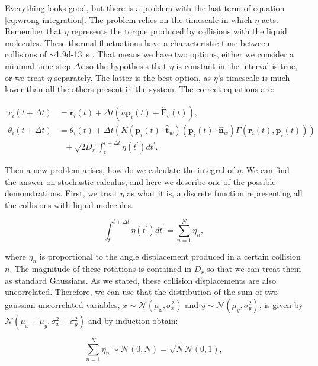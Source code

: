 Everything looks good, but there is a problem with the last term of equation \eqref{eq:wrong integration}. The problem relies on the timescale in which $\eta$ acts. Remember that $\eta$ represents the torque produced by collisions with the liquid molecules. These thermal fluctuations have a characteristic time between collisions of $\sim$\SI{1.9d-13}{\second} \cite{Soto2016KineticPhenomena}. That means we have two options, either we consider a minimal time step $\Delta t$ so the hypothesis that $\eta$ is constant in the interval is true, or we treat $\eta$ separately. The latter is the best option, as $\eta$'s timescale is much lower than all the others present in the system. The correct equations are:

\begin{align}
    \textbf{r}_i(t+\Delta t) &=  \textbf{r}_i(t) + \Delta t(u \textbf{p}_i(t) + \tilde{\textbf{F}}_c(t)), \\
    \theta_i(t+\Delta t) &=  \theta_i(t) + \Delta t(K (\textbf{p}_i(t) \cdot \hat{\textbf{t}}_w)  (\textbf{p}_i(t) \cdot \hat{\textbf{n}}_w) \Gamma(\textbf{r}_i(t), \textbf{p}_i(t))) \nonumber \\
     &\ \ \ + \sqrt{2D_r} \int_t^{t+\Delta t}\eta(t^\prime)dt^\prime .
\end{align}


Then a new problem arises, how do we calculate the integral of $\eta$. We can find the answer on stochastic calculus, and here we describe one of the possible demonstrations. First, we treat $\eta$ as what it is, a discrete function representing all the collisions with liquid molecules.

\begin{equation}
    \int_t^{t+\Delta t}\eta(t^\prime)dt^\prime = \sum_{n=1}^N \eta_n,
\end{equation}

where $\eta_n$ is proportional to the angle displacement produced in a certain collision $n$. The magnitude of these rotations is contained in $D_r$ so that we can treat them as standard Gaussians. As we stated, these collision displacements are also uncorrelated. Therefore, we can use that the distribution of the sum of two gaussian uncorrelated variables, $x\sim\mathcal{N}(\mu_x,\sigma_x^2)$ and $y\sim\mathcal{N}(\mu_y,\sigma_y^2)$, is given by $\mathcal{N}(\mu_x+\mu_y,\sigma_x^2+\sigma_y^2)$ and by induction obtain:

\begin{equation}
    \sum_{n=1}^N \eta_n \sim \mathcal{N}(0,N) = \sqrt{N}\mathcal{N}(0,1),
\end{equation}

